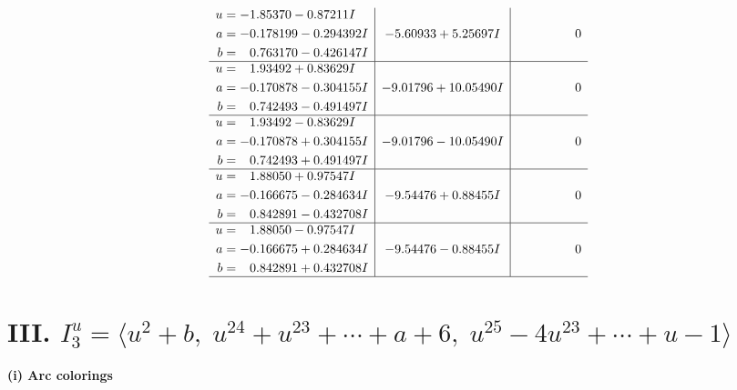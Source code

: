 \documentclass[1p]{elsarticle_modified}
\theoremstyle{definition}
\begin{document}
$$\begin{array}{c|c|c}
\begin{aligned}
u &= -1.85370 - 0.87211 I \\
a &= -0.178199 - 0.294392 I \\
b &= \phantom{-}0.763170 - 0.426147 I\end{aligned}
 & -5.60933 + 5.25697 I & \phantom{-0.000000 } 0 \\ \hline\begin{aligned}
u &= \phantom{-}1.93492 + 0.83629 I \\
a &= -0.170878 - 0.304155 I \\
b &= \phantom{-}0.742493 - 0.491497 I\end{aligned}
 & -9.01796 + 10.05490 I & \phantom{-0.000000 } 0 \\ \hline\begin{aligned}
u &= \phantom{-}1.93492 - 0.83629 I \\
a &= -0.170878 + 0.304155 I \\
b &= \phantom{-}0.742493 + 0.491497 I\end{aligned}
 & -9.01796 - 10.05490 I & \phantom{-0.000000 } 0 \\ \hline\begin{aligned}
u &= \phantom{-}1.88050 + 0.97547 I \\
a &= -0.166675 - 0.284634 I \\
b &= \phantom{-}0.842891 - 0.432708 I\end{aligned}
 & -9.54476 + 0.88455 I & \phantom{-0.000000 } 0 \\ \hline\begin{aligned}
u &= \phantom{-}1.88050 - 0.97547 I \\
a &= -0.166675 + 0.284634 I \\
b &= \phantom{-}0.842891 + 0.432708 I\end{aligned}
 & -9.54476 - 0.88455 I & \phantom{-0.000000 } 0\\
 \hline 
 \end{array}$$\newpage\newpage\renewcommand{\arraystretch}{1}
\centering \section*{III. $I^u_{3}= \langle u^2+b,\;u^{24}+u^{23}+\cdots+a+6,\;u^{25}-4 u^{23}+\cdots+u-1 \rangle$}
\flushleft \textbf{(i) Arc colorings}\\
\end{document}
